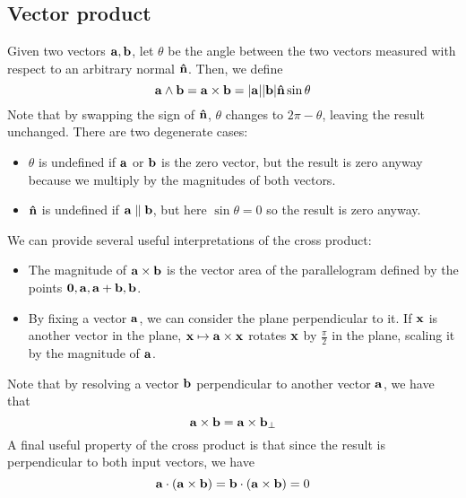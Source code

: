 \subsection{Vector product}
\begin{definition}
	Given two vectors \(\vb a, \vb b\), let \(\theta\) be the angle between the two vectors measured with respect to an arbitrary normal \(\vb{\hat n}\).
	Then, we define
	\[
		\vb a \wedge \vb b = \vb a \times \vb b = \abs{\vb a} \abs{\vb b} \vb{\hat n} \sin \theta
	\]
	Note that by swapping the sign of \(\vb{\hat n}\), \(\theta\) changes to \(2 \pi - \theta\), leaving the result unchanged.
	There are two degenerate cases:
	\begin{itemize}
		\item \(\theta\) is undefined if \(\vb a\) or \(\vb b\) is the zero vector, but the result is zero anyway because we multiply by the magnitudes of both vectors.
		\item \(\vb{\hat n}\) is undefined if \(\vb a \parallel \vb b\), but here \(\sin \theta = 0\) so the result is zero anyway.
	\end{itemize}
\end{definition}
\noindent We can provide several useful interpretations of the cross product:
\begin{itemize}
	\item The magnitude of \(\vb a \times \vb b\) is the vector area of the parallelogram defined by the points \(\vb 0, \vb a, \vb a + \vb b, \vb b\).
	\item By fixing a vector \(\vb a\), we can consider the plane perpendicular to it.
	      If \(\vb x\) is another vector in the plane, \(\vb x \mapsto \vb a \times \vb x\) rotates \(\vb x\) by \(\frac{\pi}{2}\) in the plane, scaling it by the magnitude of \(\vb a\).
\end{itemize}
Note that by resolving a vector \(\vb b\) perpendicular to another vector \(\vb a\), we have that
\[
	\vb a \times \vb b = \vb a \times \vb b_\perp
\]
A final useful property of the cross product is that since the result is perpendicular to both input vectors, we have
\[
	\vb a \cdot (\vb a \times \vb b) = \vb b \cdot(\vb a \times \vb b) = 0
\]
